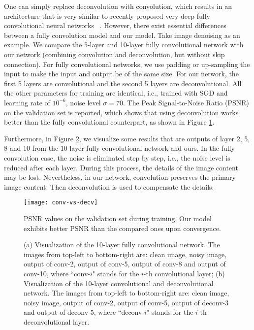 One can simply replace deconvolution with convolution, which results in an architecture that is
very similar to recently proposed very deep fully convolutional neural networks
~\cite{DBLP:conf/cvpr/LongSD15,DBLP:journals/pami/DongLHT16}. However, there exist essential
differences between a fully convolution model and our model. Take image denoising as an example.
We compare the 5-layer and 10-layer fully convolutional network with our network
(combining convolution and deconvolution, but without skip connection). For fully convolutional
networks, we use padding or up-sampling the input to make the input and output be of the same size.
For our network, the first 5 layers are convolutional and the second 5 layers are deconvolutional.
All the other parameters for training are identical, i.e., trained with SGD and learning rate of
$10^{-6}$, noise level $\sigma=70$. The Peak Signal-to-Noise Ratio (PSNR) on the validation set
is reported, which shows that using deconvolution works better than the fully convolutional
counterpart, as shown in Figure \ref{fig2}.


Furthermore, in Figure \ref{fig3}, we visualize some results that are outputs of layer 2, 5, 8 and 10
from the 10-layer fully convolutional network and ours. In the fully convolution case, the noise
is eliminated step by step, i.e., the noise level is reduced after each layer. During this process,
the details of the image content may be lost. Nevertheless, in our network, convolution  preserves
the primary image content. Then deconvolution is used to compensate the details.


\begin{figure}[htb!]
\centering
\texttt{[image: conv-vs-decv]}
\caption{ PSNR  values  on the validation set during training. Our model  exhibits better PSNR
than the compared ones upon convergence.}
\label{fig2}
\end{figure}



\begin{figure}[htb!]
\centering
{}
\caption{ (a) Visualization of the 10-layer fully convolutional network. The images from
top-left to bottom-right are: clean image, noisy image, output of conv-2, output of conv-5,
output of conv-8 and output of conv-10, where ``conv-$i$" stands for the $i$-th convolutional layer;
(b) Visualization of the 10-layer convolutional and deconvolutional network. The images from
top-left to bottom-right are: clean image, noisy image, output of conv-2, output of conv-5,
output of deconv-3 and output of deconv-5, where ``deconv-$i$" stands for the $i$-th deconvolutional layer.}
\label{fig3}
\end{figure}





